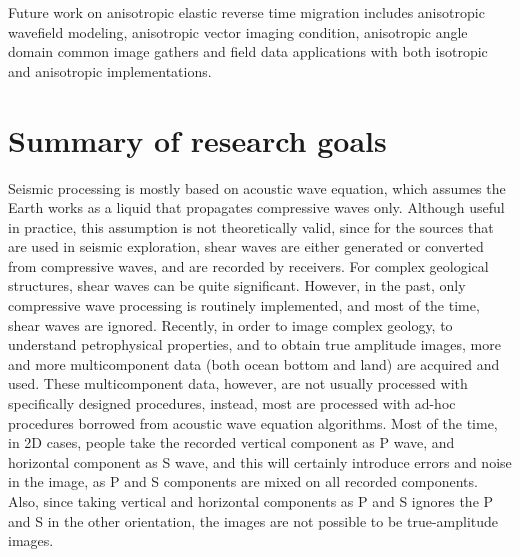 Future work on anisotropic elastic reverse time migration includes anisotropic wavefield modeling, anisotropic vector imaging condition, anisotropic angle domain common image gathers and field data applications with both isotropic and anisotropic implementations. 


\newpage
{}
\section{Summary of research  goals}


Seismic processing is mostly based on acoustic wave equation, which assumes the Earth works as a liquid that propagates compressive waves only. Although useful in practice, this assumption is not theoretically valid, since for the sources that are used in seismic exploration, shear waves are either generated or converted from compressive waves, and are recorded by receivers. For complex geological structures, shear waves can be quite significant. However, in the past, only compressive wave processing is routinely implemented, and most of the time, shear waves are ignored. Recently, in order to image complex geology, to understand petrophysical properties, and to obtain true amplitude images, more and more multicomponent data (both ocean bottom and land) are acquired and used. These multicomponent data, however, are not usually processed with specifically designed procedures, instead, most are processed with ad-hoc procedures borrowed from acoustic wave equation algorithms. Most of the time, in 2D cases, people take the recorded vertical component as P wave, and horizontal component as S wave, and this will certainly introduce errors and noise in the image, as P and S components are mixed on all recorded components. Also, since taking vertical and horizontal components as P and S ignores the P and S in the other orientation, the images are not possible to be true-amplitude images.



